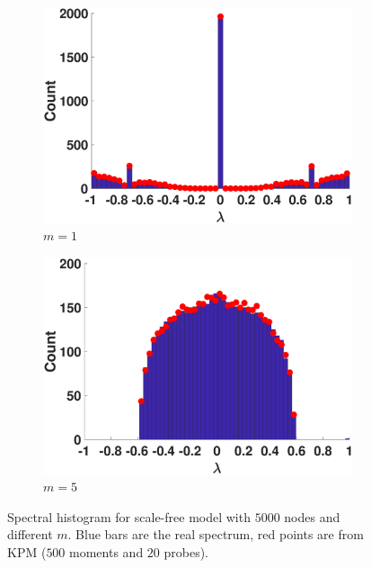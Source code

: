 \begin{figure}[ht]
  \begin{subfigure}{0.47\textwidth}
    \centering  
    \captionsetup{justification=centering}
    \includegraphics[width=\textwidth,trim = .4cm 0.5cm 3.5cm 1.3cm,clip]
    {./ndos/pics/ba_sparse}
    \caption{$m = 1$}\label{fig:ba_sparse}
  \end{subfigure}
  \begin{subfigure}{0.47\textwidth}
    \centering
    \captionsetup{justification=centering}
    \includegraphics[width=\textwidth,trim = .4cm 0.5cm 3.5cm 1.3cm,clip]
    {./ndos/pics/ba_dense}
    \caption{$m = 5$}\label{fig:ba_dense}
  \end{subfigure}
  \caption{Spectral histogram for scale-free model with $5000$ nodes and
  different $m$. Blue bars are the real spectrum, red points are from KPM
  ($500$ moments and $20$ probes).} \label{fig:ba}
\end{figure}

